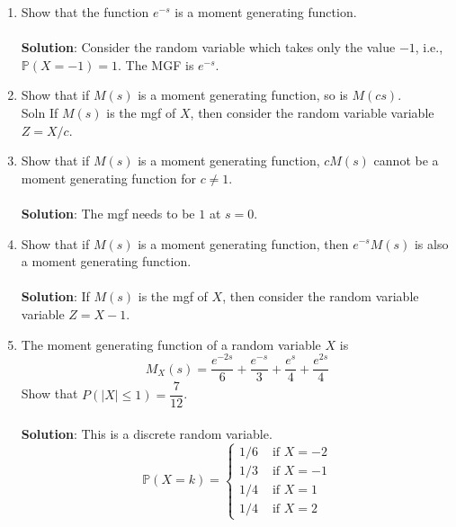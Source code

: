 \documentclass{article}
\newcommand{\abs}[1]{\displaystyle\left\lvert#1\right\rvert}
\newcommand{\Pb}{\mathbb{P}}
\newcommand{\bkt}[1]{\left(#1\right)}
\newcommand{\soln}[1]{\\ \textbf{Solution}:#1\\}
\begin{document}
\begin{enumerate}
	\soln{Use the MGF to conclude.}
	\item
	Show that the function $e^{-s}$ is a moment generating function.\\
	\soln{
	Consider the random variable which takes only the value $-1$, i.e., $\Pb\bkt{X=-1}=1$. The MGF is $e^{-s}$.
	}
	\item
	Show that if $M(s)$ is a moment generating function, so is $M(cs)$.\\
	Soln{
	If $M(s)$ is the mgf of $X$, then consider the random variable variable $Z = X/c$.
	}
	\item
	Show that if $M(s)$ is a moment generating function, $cM(s)$ cannot be a moment generating function for $c \neq 1$.\\
	\soln{
	The mgf needs to be $1$ at $s=0$.
	}
	\item
	Show that if $M(s)$ is a moment generating function, then $e^{-s}M(s)$ is also a moment generating function.\\
	\soln{
	If $M(s)$ is the mgf of $X$, then consider the random variable variable $Z = X-1$.
	}
	\item
	The moment generating function of a random variable $X$ is
	$$M_X(s) = \dfrac{e^{-2s}}6 + \dfrac{e^{-s}}3 + \dfrac{e^{s}}4 + \dfrac{e^{2s}}4$$
	Show that $P\bkt{\abs{X} \leq 1} = \dfrac7{12}$.\\
	\soln{
	This is a discrete random variable.
	$$\Pb\bkt{X=k}=\begin{cases}
	1/6 & \text{ if }X=-2\\
	1/3 & \text{ if }X=-1\\
	1/4 & \text{ if }X=1\\
	1/4 & \text{ if }X=2
	\end{cases}$$
	}
	\end{enumerate}
\end{document}
